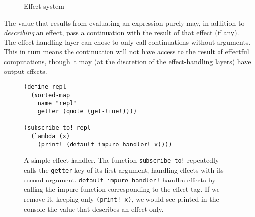 \begin{figure}[H]
\caption{Effect system}
\label{f:effects}
\end{figure}

The value that results from evaluating an expression purely may, in addition to
\textit{describing} an effect, pass a continuation with the result of that
effect (if any). The effect-handling layer can chose to only call continuations
without arguments. This in turn means the continuation will not have access to
the result of effectful computations, though it may (at the discretion of the
effect-handling layers) have output effects.

\begin{figure}[H]
\begin{lstlisting}
(define repl
  (sorted-map
    name "repl"
    getter (quote (get-line!))))

(subscribe-to! repl
  (lambda (x)
    (print! (default-impure-handler! x))))
\end{lstlisting}
    \caption{A simple effect handler. The function \texttt{subscribe-to!}
    repeatedly calls the \texttt{getter} key of its first argument, handling
    effects with its second argument. \texttt{default-impure-handler!} handles
    effects by calling the impure function corresponding to the effect tag. If
    we remove it, keeping only \texttt{(print! x)}, we would see printed in the
    console the value that describes an effect only.}
\label{f:eff-handler}
\end{figure}

